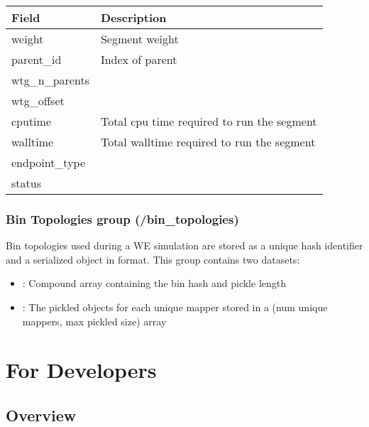 \documentclass[letterpaper,10pt,english]{sphinxmanual}
\begin{document}
\begin{savenotes}\sphinxattablestart
\centering
\begin{tabulary}{\linewidth}[t]{|T|T|}
\hline
\sphinxstyletheadfamily 
Field
&\sphinxstyletheadfamily 
Description
\\
\hline
weight
&
Segment weight
\\
\hline
parent\_id
&
Index of parent
\\
\hline
wtg\_n\_parents
&\\
\hline
wtg\_offset
&\\
\hline
cputime
&
Total cpu time required to run the segment
\\
\hline
walltime
&
Total walltime required to run the segment
\\
\hline
endpoint\_type
&\\
\hline
status
&\\
\hline
\end{tabulary}
\par
\sphinxattableend\end{savenotes}


\subsection{Bin Topologies group (/bin\_topologies)}
\label{\detokenize{users_guide/hdf5:bin-topologies-group-bin-topologies}}
Bin topologies used during a WE simulation are stored as a unique hash
identifier and a serialized  object in  format. This group contains
two datasets:
\begin{itemize}
\item {} 
: Compound array containing the bin hash and pickle length

\item {} 
: The pickled  objects for each unique mapper stored
in a (num unique mappers, max pickled size) array

\end{itemize}


\chapter{For Developers}
\label{\detokenize{sphinx_index:for-developers}}

\section{Overview}
\label{\detokenize{development/overview:overview}}\label{\detokenize{development/overview::doc}}
\end{document}
